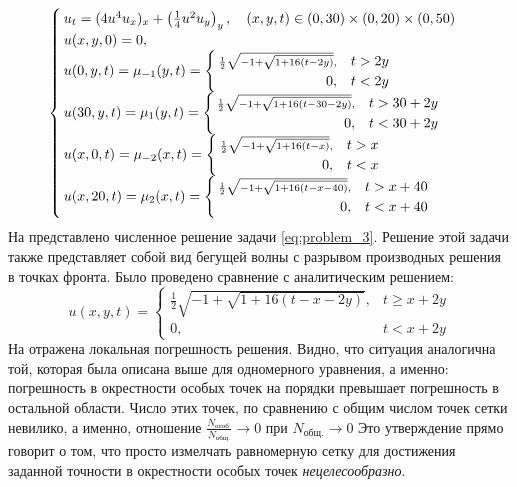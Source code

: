 \begin{equation}\label{eq:problem_3}
    \textstyle
    \begin{cases}
        u_t = (4u^4 u_x)_x + \left( \frac{1}{4} u^2 u_y \right)_y, \quad (x, y, t) \in (0, 30) \times (0, 20) \times (0, 50)\\
        u(x, y, 0) = 0,\\
        u(0, y, t) = \mu_{-1}(y, t) = \begin{cases}
            \scriptstyle\frac{1}{2}\sqrt{-1 + \sqrt{1 + 16(t - 2y)}}, & t > 2y\\
            \hfill 0, & t < 2y
        \end{cases}\\
        u(30, y, t) = \mu_1(y, t) = \begin{cases}
            \scriptstyle\frac{1}{2}\sqrt{-1 + \sqrt{1 + 16(t - 30 - 2y)}}, & t > 30 + 2y\\
            \hfill 0, & t < 30 + 2y
        \end{cases}\\
        u(x, 0, t) = \mu_{-2}(x, t) = \begin{cases}
            \scriptstyle\frac{1}{2}\sqrt{-1 + \sqrt{1 + 16(t - x)}}, & t > x\\
            \hfill 0, & t < x
        \end{cases}\\
        u(x, 20, t) = \mu_2(x, t) = \begin{cases}
            \scriptstyle\frac{1}{2}\sqrt{-1 + \sqrt{1 + 16(t - x - 40)}}, & t > x + 40\\
            \hfill 0, & t < x + 40
        \end{cases}
    \end{cases}
\end{equation}
На  представлено численное решение задачи \eqref{eq:problem_3}.
Решение этой задачи также представляет собой вид бегущей волны с разрывом производных решения в точках фронта.
Было проведено сравнение с аналитическим решением:
\begin{equation*}
    u(x, y, t) = \begin{cases}
        \frac{1}{2}\sqrt{-1 + \sqrt{1 + 16(t - x - 2y)}}, & t \ge x + 2y\\
        0, & t < x + 2y
    \end{cases}
\end{equation*}
На  отражена локальная погрешность решения.
Видно, что ситуация аналогична той, которая была описана выше для одномерного уравнения, а именно: погрешность в окрестности особых точек на порядки превышает погрешность в остальной области.
Число этих точек, по сравнению с общим числом точек сетки невилико, а именно, отношение 
$
    \frac{N_{\text{особ.}}}{N_{\text{общ.}}} \rightarrow 0
$
при
$
    N_{\text{общ.}} \rightarrow 0
$
Это утверждение прямо говорит о том, что просто измелчать равномерную сетку для достижения заданной точности в окрестности особых точек \emph{нецелесообразно}.